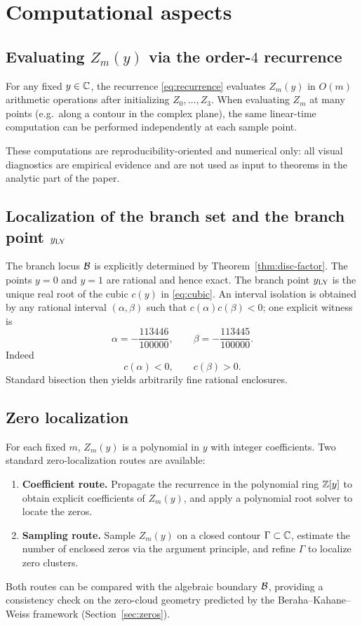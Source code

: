 \section{Computational aspects}\label{sec:algo}

\subsection{Evaluating \texorpdfstring{$Z_m(y)$}{Z\_m(y)} via the order-\texorpdfstring{$4$}{4} recurrence}

For any fixed $y\in\mathbb{C}$, the recurrence \eqref{eq:recurrence} evaluates $Z_m(y)$ in $O(m)$ arithmetic operations after initializing $Z_0,\dots,Z_3$.
When evaluating $Z_m$ at many points (e.g.\ along a contour in the complex plane), the same linear-time computation can be performed independently at each sample point.

These computations are reproducibility-oriented and numerical only: all visual diagnostics are empirical evidence and are not used as input to theorems in the analytic part of the paper.

\subsection{Localization of the branch set and the branch point \texorpdfstring{$y_{\mathrm{LY}}$}{y\_LY}}

The branch locus $\mathcal{B}$ is explicitly determined by Theorem~\ref{thm:disc-factor}.
The points $y=0$ and $y=1$ are rational and hence exact.
The branch point $y_{\mathrm{LY}}$ is the unique real root of the cubic $c(y)$ in \eqref{eq:cubic}.
An interval isolation is obtained by any rational interval $(\alpha,\beta)$ such that $c(\alpha)c(\beta)<0$; one explicit witness is
\[
\alpha=-\frac{113446}{100000},\qquad
\beta=-\frac{113445}{100000}.
\]
Indeed
\[
c(\alpha)<0,\qquad c(\beta)>0.
\]
Standard bisection then yields arbitrarily fine rational enclosures.

\subsection{Zero localization}

For each fixed $m$, $Z_m(y)$ is a polynomial in $y$ with integer coefficients.
Two standard zero-localization routes are available:
\begin{enumerate}
  \item \textbf{Coefficient route.} Propagate the recurrence in the polynomial ring $\mathbb{Z}[y]$ to obtain explicit coefficients of $Z_m(y)$, and apply a polynomial root solver to locate the zeros.
  \item \textbf{Sampling route.} Sample $Z_m(y)$ on a closed contour $\Gamma\subset\mathbb{C}$, estimate the number of enclosed zeros via the argument principle, and refine $\Gamma$ to localize zero clusters.
\end{enumerate}
Both routes can be compared with the algebraic boundary $\mathcal{B}$, providing a consistency check on the zero-cloud geometry predicted by the Beraha--Kahane--Weiss framework (Section~\ref{sec:zeros}).


